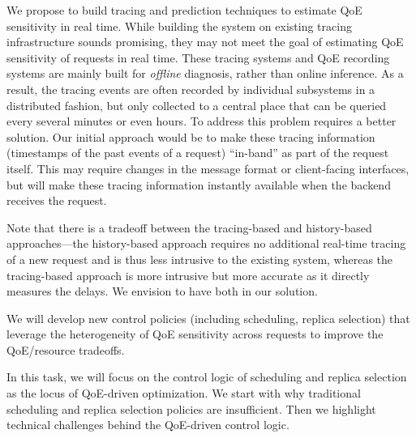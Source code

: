 We propose to build tracing and prediction techniques to estimate QoE sensitivity in real time.
While building the system on existing tracing infrastructure sounds promising,
they may not meet the goal of estimating QoE sensitivity of requests in real time. 
These tracing systems and QoE recording systems are mainly built for {\em offline} diagnosis, rather than online inference. As a result, the tracing events are often recorded by individual subsystems in a distributed fashion, but only collected to a central place that can be queried every several minutes or even hours. 
To address this problem requires a better solution. 
Our initial approach would be to make these tracing information (\eg timestamps of the past events of a request) ``in-band'' as part of the request itself. This may require changes in the message format or client-facing interfaces, but will make these tracing information instantly available when the backend receives the request.

Note that there is a tradeoff between the tracing-based and history-based approaches---the history-based approach requires no additional real-time tracing of a new request and is thus less intrusive to the existing system, whereas the tracing-based approach is more intrusive but more accurate as it directly measures the delays. We envision to have both in our solution.


\label{sec:design}

\begin{task}
We will develop new control policies (including scheduling, replica selection) that leverage the heterogeneity of QoE sensitivity across requests to improve the QoE/resource tradeoffs.
\end{task}

In this task, we will focus on the control logic of scheduling and replica selection as the locus of QoE-driven optimization. 
We start with why traditional scheduling and replica selection policies are insufficient.
Then we highlight technical challenges behind the QoE-driven control logic.



